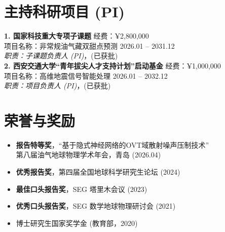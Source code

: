 \documentclass[11pt,a4paper]{article}
\begin{document}
\section{主持科研项目 (PI)}
\noindent
\textbf{1. 国家科技重大专项子课题} \hfill 经费：¥2,800,000 \\
项目名称：非常规油气藏双甜点预测 \hfill 2026.01 -- 2031.12 \\
\textit{职责：子课题负责人 (PI)}，(已获批)\\[6pt]
\noindent
\textbf{2. 西安交通大学“青年拔尖人才支持计划”启动基金} \hfill 经费：¥1,000,000 \\
项目名称：高维地震信号智能处理 \hfill 2026.01 -- 2032.12 \\
\textit{职责：项目负责人 (PI)}，(已获批)

\section{荣誉与奖励}
\begin{itemize}
    \item \textbf{报告特等奖}，“基于隐式神经网络的OVT域散射噪声压制技术” \\
    第八届油气地球物理学术年会，青岛 (2026.04)
    \item \textbf{优秀报告奖}，第四届全国地球科学研究生论坛 (2024)
    \item \textbf{最佳口头报告奖}，SEG 塔里木会议 (2023)
    \item \textbf{优秀口头报告奖}，SEG 数学地球物理研讨会 (2021)
    \item 博士研究生国家奖学金 (教育部，2020)
\end{itemize}

\end{document}

